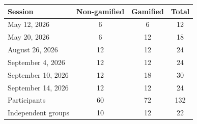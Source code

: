 \begin{tabular}{@{}lccc@{}}
\midrule \midrule
Session & Non-gamified & Gamified & Total \\
\midrule
May 12, 2026 & 6 & 6 & 12 \\
May 20, 2026 & 6 & 12 & 18 \\
August 26, 2026 & 12 & 12 & 24 \\
September 4, 2026 & 12 & 12 & 24 \\
September 10, 2026 & 12 & 18 & 30 \\
September 14, 2026 & 12 & 12 & 24 \\
\midrule
Participants & 60 & 72 & 132 \\
Independent groups & 10 & 12 & 22 \\
\midrule \midrule
\end{tabular}

